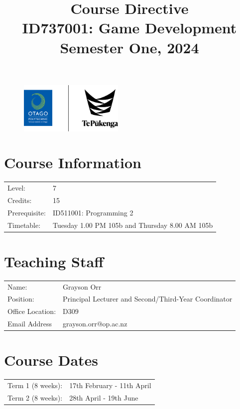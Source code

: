 \documentclass{article}
\author{}
\begin{document}
\begin{figure}
	\includegraphics[width=50mm]{../img/logo.png} 
\end{figure}

\title{Course Directive\\ID737001: Game Development\\Semester One, 2024}
\date{}
\maketitle

\section*{Course Information}
\begin{tabular}{ll}
	Level:        & 7 \\
	Credits:      & 15                                                             \\
	Prerequisite: & ID511001: Programming 2                                  \\
	Timetable:    & Tuesday 1.00 PM 105b and Thursday 8.00 AM 105b     
\end{tabular}

\section*{Teaching Staff}
\begin{tabular}{ll}
	Name:            & Grayson Orr                           \\
	Position:        & Principal Lecturer and Second/Third-Year Coordinator\\
	Office Location: & D309                                 \\
	Email Address    & grayson.orr@op.ac.nz                    \\
\end{tabular}

\section*{Course Dates}
\begin{tabular}{ll}
	Term 1 (8 weeks):             & 17th February - 11th April           \\ 
	Term 2 (8 weeks):             & 28th April - 19th June             \\
\end{tabular}
\end{document}
